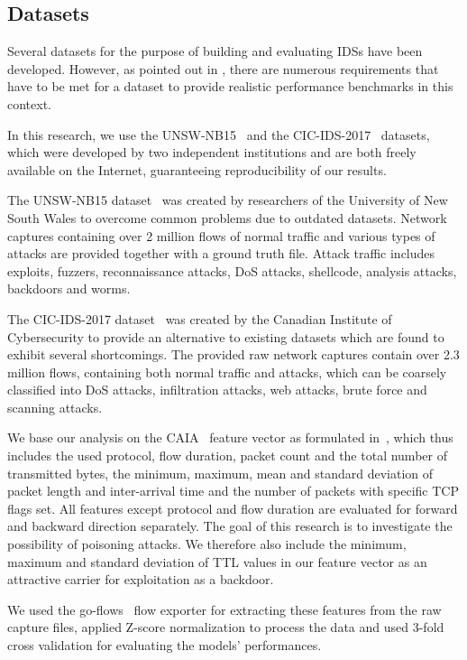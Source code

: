 \documentclass[10pt,sigconf,letterpaper,dvipsnames]{acmart}
\begin{document}
\subsection{Datasets}
Several datasets for the purpose of building and evaluating IDSs have been developed. However, as pointed out in \cite{gharib_evaluation_2016}, there are numerous requirements that have to be met for a dataset to provide realistic performance benchmarks in this context.

In this research, we use the UNSW-NB15~\cite{moustafa_unsw-nb15:_2015} and the CIC-IDS-2017~\cite{sharafaldin_toward_2018} datasets, which were developed by two independent institutions and are both freely available on the Internet, guaranteeing reproducibility of our results.

The UNSW-NB15 dataset~\cite{moustafa_unsw-nb15:_2015} was created by researchers of the University of New South Wales to overcome common problems due to outdated datasets. Network captures containing over 2 million flows of normal traffic and various types of attacks are provided together with a ground truth file. Attack traffic includes exploits, fuzzers, reconnaissance attacks, DoS attacks, shellcode, analysis attacks, backdoors and worms.

The CIC-IDS-2017 dataset~\cite{sharafaldin_toward_2018} was created by the Canadian Institute of Cybersecurity to provide an alternative to existing datasets which are found to exhibit several shortcomings. The provided raw network captures contain over 2.3 million flows, containing both normal traffic and attacks, which can be coarsely classified into DoS attacks, infiltration attacks, web attacks, brute force and scanning attacks.

We base our analysis on the CAIA~\cite{williams_preliminary_2006} feature vector as formulated in~\cite{meghdouri_analysis_2018}, which thus includes the used protocol, flow duration, packet count and the total number of transmitted bytes, the minimum, maximum, mean and standard deviation of packet length and inter-arrival time and the number of packets with specific TCP flags set. All features except protocol and flow duration are evaluated for forward and backward direction separately. The goal of this research is to investigate the possibility of poisoning attacks. We therefore also include the minimum, maximum and standard deviation of TTL values in our feature vector as an attractive carrier for exploitation as a backdoor. %

We used the go-flows~\cite{vormayr_cn-tu/go-flows_2019} flow exporter for extracting these features from the raw capture files, applied Z-score normalization to process the data and used 3-fold cross validation for evaluating the models' performances.
\end{document}
